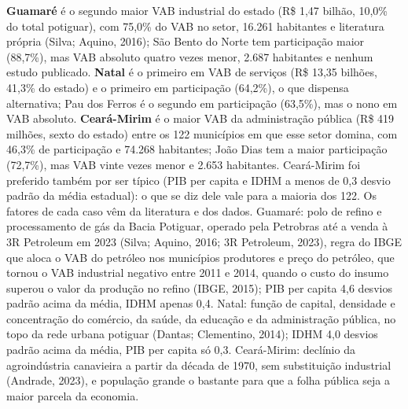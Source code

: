 \documentclass[12pt,a4paper]{article}
\begin{document}
\textbf{Guamaré} é o segundo maior VAB industrial do estado (R\$ 1,47 bilhão, 10,0\% do total potiguar), com 75,0\% do VAB no setor, 16.261 habitantes e literatura própria (Silva; Aquino, 2016); São Bento do Norte tem participação maior (88,7\%), mas VAB absoluto quatro vezes menor, 2.687 habitantes e nenhum estudo publicado. \textbf{Natal} é o primeiro em VAB de serviços (R\$ 13,35 bilhões, 41,3\% do estado) e o primeiro em participação (64,2\%), o que dispensa alternativa; Pau dos Ferros é o segundo em participação (63,5\%), mas o nono em VAB absoluto. \textbf{Ceará-Mirim} é o maior VAB da administração pública (R\$ 419 milhões, sexto do estado) entre os 122 municípios em que esse setor domina, com 46,3\% de participação e 74.268 habitantes; João Dias tem a maior participação (72,7\%), mas VAB vinte vezes menor e 2.653 habitantes. Ceará-Mirim foi preferido também por ser típico (PIB per capita e IDHM a menos de 0,3 desvio padrão da média estadual): o que se diz dele vale para a maioria dos 122. Os fatores de cada caso vêm da literatura e dos dados. Guamaré: polo de refino e processamento de gás da Bacia Potiguar, operado pela Petrobras até a venda à 3R Petroleum em 2023 (Silva; Aquino, 2016; 3R Petroleum, 2023), regra do IBGE que aloca o VAB do petróleo nos municípios produtores e preço do petróleo, que tornou o VAB industrial negativo entre 2011 e 2014, quando o custo do insumo superou o valor da produção no refino (IBGE, 2015); PIB per capita 4,6 desvios padrão acima da média, IDHM apenas 0,4. Natal: função de capital, densidade e concentração do comércio, da saúde, da educação e da administração pública, no topo da rede urbana potiguar (Dantas; Clementino, 2014); IDHM 4,0 desvios padrão acima da média, PIB per capita só 0,3. Ceará-Mirim: declínio da agroindústria canavieira a partir da década de 1970, sem substituição industrial (Andrade, 2023), e população grande o bastante para que a folha pública seja a maior parcela da economia.
\end{document}
